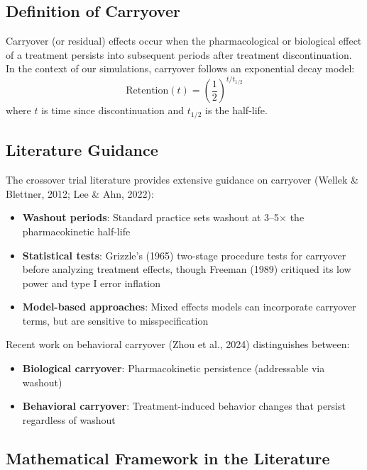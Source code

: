\documentclass[11pt,a4paper]{article}
\begin{document}
\subsection{Definition of Carryover}

Carryover (or residual) effects occur when the pharmacological or biological
effect of a treatment persists into subsequent periods after treatment
discontinuation. In the context of our simulations, carryover follows an
exponential decay model:
\begin{equation}
\text{Retention}(t) = \left(\frac{1}{2}\right)^{t / t_{1/2}}
\end{equation}
where $t$ is time since discontinuation and $t_{1/2}$ is the half-life.

\subsection{Literature Guidance}

The crossover trial literature provides extensive guidance on carryover
(Wellek \& Blettner, 2012; Lee \& Ahn, 2022):

\begin{itemize}
    \item \textbf{Washout periods}: Standard practice sets washout at 3--5$\times$ the
          pharmacokinetic half-life
    \item \textbf{Statistical tests}: Grizzle's (1965) two-stage procedure tests for
          carryover before analyzing treatment effects, though Freeman (1989) critiqued
          its low power and type I error inflation
    \item \textbf{Model-based approaches}: Mixed effects models can incorporate carryover
          terms, but are sensitive to misspecification
\end{itemize}

Recent work on behavioral carryover (Zhou et al., 2024) distinguishes between:
\begin{itemize}
    \item \textbf{Biological carryover}: Pharmacokinetic persistence (addressable via washout)
    \item \textbf{Behavioral carryover}: Treatment-induced behavior changes that persist
          regardless of washout
\end{itemize}

\subsection{Mathematical Framework in the Literature}
\end{document}
